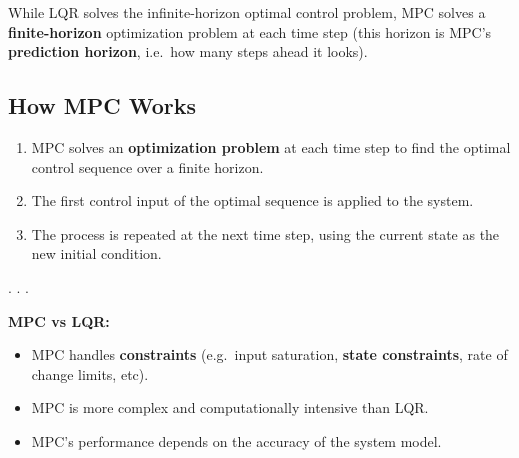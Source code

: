 \documentclass[
  letterpaper,
  DIV=11,
  numbers=noendperiod,
  oneside]{scrartcl}
\providecommand{\tightlist}{%
  \setlength{\itemsep}{0pt}\setlength{\parskip}{0pt}}
\begin{document}
\begin{tcolorbox}[enhanced jigsaw, rightrule=.15mm, coltitle=black, titlerule=0mm, breakable, title=\textcolor{quarto-callout-tip-color}{\faLightbulb}\hspace{0.5em}{Tip}, bottomrule=.15mm, colback=white, toprule=.15mm, opacityback=0, opacitybacktitle=0.6, leftrule=.75mm, left=2mm, colbacktitle=quarto-callout-tip-color!10!white, bottomtitle=1mm, toptitle=1mm, arc=.35mm, colframe=quarto-callout-tip-color-frame]

While LQR solves the infinite-horizon optimal control problem, MPC
solves a \textbf{finite-horizon} optimization problem at each time step
(this horizon is MPC's \textbf{prediction horizon}, i.e.~how many steps
ahead it looks).

\end{tcolorbox}

\subsection{How MPC Works}\label{how-mpc-works}

\begin{enumerate}
\def\labelenumi{\arabic{enumi}.}
\tightlist
\item
  MPC solves an \textbf{optimization problem} at each time step to find
  the optimal control sequence over a finite horizon.
\item
  The first control input of the optimal sequence is applied to the
  system.
\item
  The process is repeated at the next time step, using the current state
  as the new initial condition.
\end{enumerate}

. . .

\textbf{MPC vs LQR:}

\begin{itemize}
\tightlist
\item
  MPC handles \textbf{constraints} (e.g.~input saturation, \textbf{state
  constraints}, rate of change limits, etc).
\item
  MPC is more complex and computationally intensive than LQR.
\item
  MPC's performance depends on the accuracy of the system model.
\end{itemize}
\end{document}
